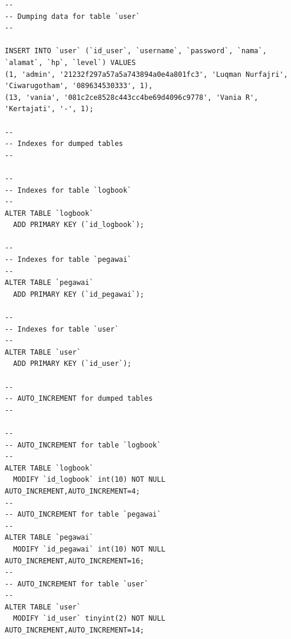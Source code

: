 \begin{enumerate}
\begin{lstlisting}
--
-- Dumping data for table `user`
--

INSERT INTO `user` (`id_user`, `username`, `password`, `nama`, `alamat`, `hp`, `level`) VALUES
(1, 'admin', '21232f297a57a5a743894a0e4a801fc3', 'Luqman Nurfajri', 'Ciwarugotham', '089634530333', 1),
(13, 'vania', '081c2ce8528c443cc4be69d4096c9778', 'Vania R', 'Kertajati', '-', 1);

--
-- Indexes for dumped tables
--

--
-- Indexes for table `logbook`
--
ALTER TABLE `logbook`
  ADD PRIMARY KEY (`id_logbook`);

--
-- Indexes for table `pegawai`
--
ALTER TABLE `pegawai`
  ADD PRIMARY KEY (`id_pegawai`);

--
-- Indexes for table `user`
--
ALTER TABLE `user`
  ADD PRIMARY KEY (`id_user`);

--
-- AUTO_INCREMENT for dumped tables
--

--
-- AUTO_INCREMENT for table `logbook`
--
ALTER TABLE `logbook`
  MODIFY `id_logbook` int(10) NOT NULL AUTO_INCREMENT,AUTO_INCREMENT=4;
--
-- AUTO_INCREMENT for table `pegawai`
--
ALTER TABLE `pegawai`
  MODIFY `id_pegawai` int(10) NOT NULL AUTO_INCREMENT,AUTO_INCREMENT=16;
--
-- AUTO_INCREMENT for table `user`
--
ALTER TABLE `user`
  MODIFY `id_user` tinyint(2) NOT NULL AUTO_INCREMENT,AUTO_INCREMENT=14;
\end{lstlisting}

\end{enumerate}